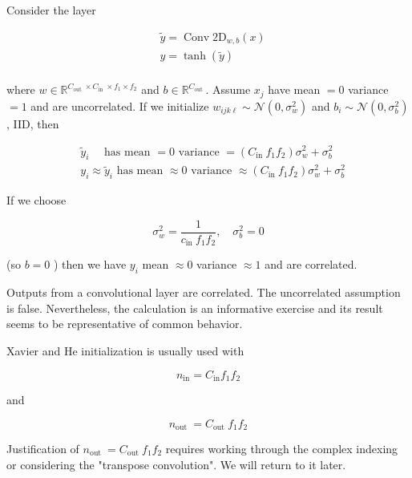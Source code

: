 \documentclass{report}
\begin{document}
\begin{definition}
    Consider the layer

    $$
    \begin{aligned}
    & \tilde{y}=\operatorname{Conv} 2 \mathrm{D}_{w, b}(x) \\
    & y=\tanh (\tilde{y}) \\
    \end{aligned}
    $$

    where $w \in \mathbb{R}^{C_{\text {out }} \times C_{\text {in }} \times f_{1} \times f_{2}}$ and $b \in \mathbb{R}^{C_{\text {out }}}$. Assume $x_{j}$ have mean $=0$ variance $=1$ and are uncorrelated. If we initialize $w_{i j k \ell} \sim \mathcal{N}\left(0, \sigma_{w}^{2}\right)$ and $b_{i} \sim \mathcal{N}\left(0, \sigma_{b}^{2}\right)$, IID, then

    $$
    \begin{aligned}
    & \tilde{y}_{i} \quad \text { has mean }=0 \text { variance }=\left(C_{\text {in }} f_{1} f_{2}\right) \sigma_{w}^{2}+\sigma_{b}^{2} \\
    & y_{i} \approx \tilde{y}_{i} \text { has mean } \approx 0 \text { variance } \approx\left(C_{\text {in }} f_{1} f_{2}\right) \sigma_{w}^{2}+\sigma_{b}^{2}
    \end{aligned}
    $$

    If we choose

    $$
    \sigma_{w}^{2}=\frac{1}{c_{\text {in }} f_{1} f_{2}}, \quad \sigma_{b}^{2}=0
    $$

    (so $b=0$ ) then we have $y_{i}$ mean $\approx 0$ variance $\approx 1$ and are correlated.

    \par\noindent\textcolor{gray}{\hdashrule{\textwidth}{0.4pt}{1pt 2pt}}

    Outputs from a convolutional layer are correlated. The uncorrelated assumption is false. Nevertheless, the calculation is an informative exercise and its result seems to be representative of common behavior.

    Xavier and He initialization is usually used with

    $$
    n_{\mathrm{in}}=C_{\mathrm{in}} f_{1} f_{2}
    $$

    and

    $$
    n_{\text {out }}=C_{\text {out }} f_{1} f_{2}
    $$

    Justification of $n_{\text {out }}=C_{\text {out }} f_{1} f_{2}$ requires working through the complex indexing or considering the "transpose convolution". We will return to it later.
\end{definition}
\end{document}
